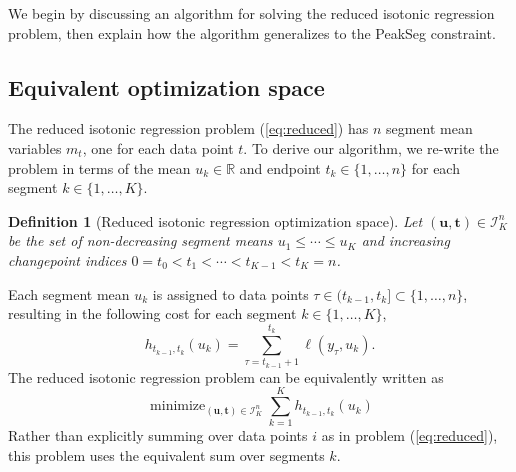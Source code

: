 \documentclass[aoas]{imsart}
\newtheorem{lemma}{Lemma}
\newtheorem{definition}{Definition}
\DeclareMathOperator*{\minimize}{minimize}
\newcommand{\RR}{\mathbb R}
\begin{document}
We begin by discussing an algorithm for solving the reduced isotonic
regression problem, then explain how the algorithm generalizes to
the PeakSeg constraint.

\subsection{Equivalent optimization space}

The reduced isotonic regression problem (\ref{eq:reduced}) has $n$
segment mean variables $m_t$, one for each data point $t$. To derive
our algorithm, we re-write the problem in terms of the mean
$u_k\in\RR$ and endpoint $t_k\in\{1,\dots,n\}$ for each
segment $k\in\{1,\dots, K\}$.
\begin{definition}[Reduced isotonic regression optimization space]
\label{def:Ibar}
  Let $(\mathbf u, \mathbf t)\in{\mathcal I}^n_K$ be the set of
  non-decreasing segment means $u_1\leq\cdots\leq u_K$ and
  increasing changepoint indices $0=t_0<t_1<\cdots<t_{K-1}<t_K=n$.
\end{definition}
Each segment mean $u_k$ is assigned to data points
$\tau\in(t_{k-1},t_k]\subset\{1,\dots,n\}$, resulting in the following
cost for each segment $k\in\{1, \dots, K\}$, 
\begin{equation}
  \label{eq:h}
  h_{t_{k-1}, t_k}(u_k) = \sum_{\tau=t_{k-1}+1}^{t_k} \ell(y_\tau, u_k).
\end{equation}
The reduced isotonic regression problem can be equivalently written as
\begin{equation}
  \label{eq:isotonic_ut}
  \minimize_{(\mathbf u, \mathbf t)\in{\mathcal I}^n_K}
  \sum_{k=1}^K
  h_{t_{k-1}, t_k}(u_k)
\end{equation}
Rather than explicitly summing over data points $i$ as in problem
(\ref{eq:reduced}), this problem uses the equivalent sum over segments $k$. 
  


\end{document}
